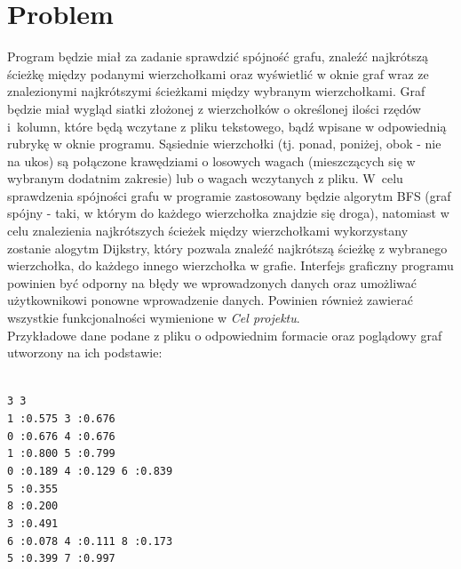 \documentclass[12pt, a4paper]{article}
\begin{document}
\section{Problem}
Program będzie miał za zadanie sprawdzić spójność grafu, znaleźć najkrótszą ścieżkę między podanymi wierzchołkami oraz wyświetlić w oknie graf wraz ze znalezionymi najkrótszymi ścieżkami między wybranym wierzchołkami. Graf będzie miał wygląd siatki złożonej z wierzchołków o określonej ilości rzędów i~kolumn, które będą wczytane z pliku tekstowego, bądź wpisane w odpowiednią rubrykę w oknie programu. Sąsiednie wierzchołki (tj. ponad, poniżej, obok - nie na ukos) są połączone krawędziami o losowych wagach (mieszczących się w wybranym dodatnim zakresie) lub o wagach wczytanych z pliku. W~celu sprawdzenia spójności grafu w programie zastosowany będzie algorytm BFS (graf spójny - taki, w którym do każdego wierzchołka znajdzie się droga), natomiast w celu znalezienia najkrótszych ścieżek między wierzchołkami wykorzystany zostanie alogytm Dijkstry, który pozwala znaleźć najkrótszą ścieżkę z wybranego wierzchołka, do każdego innego wierzchołka w grafie. Interfejs graficzny programu powinien być odporny na błędy we wprowadzonych danych oraz umożliwać użytkownikowi ponowne wprowadzenie danych. Powinien również zawierać wszystkie funkcjonalności wymienione w \textit{Cel projektu}.\\

Przykładowe dane podane z pliku o odpowiednim formacie oraz poglądowy graf utworzony na ich podstawie:\\\\
\begin{tabbing}
\texttt{3 3}     \= \\
\>\texttt{1 :0.575  3 :0.676}\\
\>\texttt{0 :0.676  4 :0.676}\\
\>\texttt{1 :0.800  5 :0.799}\\
\>\texttt{0 :0.189  4 :0.129  6 :0.839}\\
\>\texttt{5 :0.355}\\
\>\texttt{8 :0.200}\\
\>\texttt{3 :0.491}\\
\>\texttt{6 :0.078  4 :0.111 8 :0.173}\\
\>\texttt{5 :0.399  7 :0.997}\\
\end{tabbing}
\end{document}

